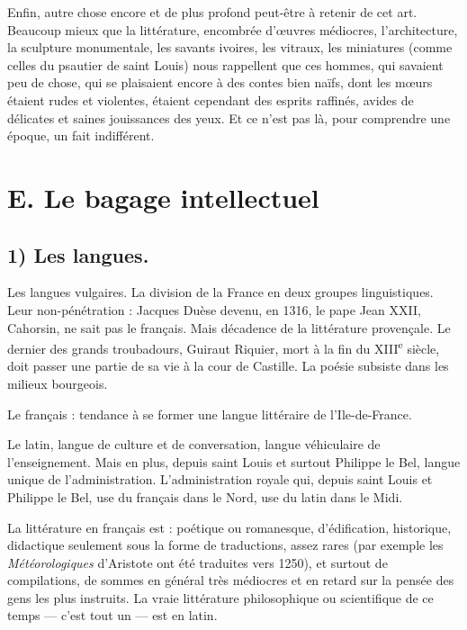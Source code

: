 \documentclass[french,twoside]{book} %
\begin{document}
Enfin, autre chose encore et de plus profond peut-être à retenir de cet art. Beaucoup mieux que la littérature, encombrée d’œuvres médiocres, l’architecture, la sculpture monumentale, les savants ivoires, les vitraux, les miniatures (comme celles du psautier de saint Louis) nous rappellent que ces hommes, qui savaient peu de chose, qui se plaisaient encore à des contes bien naïfs, dont les mœurs étaient rudes et violentes, étaient cependant des esprits raffinés, avides de délicates et saines jouissances des yeux. Et ce n’est pas là, pour comprendre une époque, un fait indifférent.
\section[E. Le bagage intellectuel]{E. Le bagage intellectuel}
\label{c11e}
\subsection[1) Les langues.]{1) Les langues.}

\begin{listalpha}[itemsep=\baselineskip,]
\item Les langues vulgaires. La division de la France en deux groupes linguistiques. Leur non-pénétration : Jacques Duèse devenu, en 1316, le pape Jean XXII, Cahorsin, ne sait pas le français. Mais décadence de la littérature provençale. Le dernier des grands troubadours, Guiraut Riquier, mort à la fin du XIII\textsuperscript{e} siècle, doit passer une partie de sa vie à la cour de Castille. La poésie subsiste dans les milieux bourgeois.\par
Le français : tendance à se former une langue littéraire de l’Ile-de-France.

\item Le latin, langue de culture et de conversation, langue véhiculaire de l’enseignement. Mais en plus, depuis saint Louis et surtout Philippe le Bel, langue unique de l’administration. L’administration royale qui, depuis saint Louis et Philippe le Bel, use du français dans le Nord, use du latin dans le Midi.

\end{listalpha}\noindent La littérature en français est : poétique ou romanesque, d’édification, historique, didactique seulement sous la forme de traductions, assez rares (par exemple les {\itshape Météorologiques} d’Aristote ont été traduites vers 1250), et surtout de compilations, de sommes en général très médiocres et en retard sur la pensée des gens les plus instruits. La vraie littérature philosophique ou scientifique de ce temps — c’est tout un — est en latin.
\end{document}
